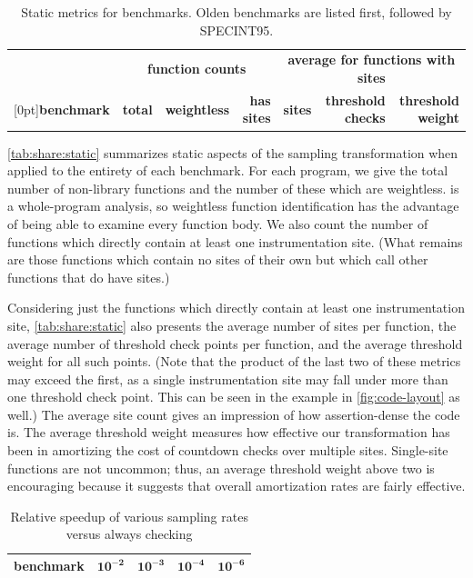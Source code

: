 \begin{table}[tb]
  \centering
  \small
  \begin{tabular}{|l|rrr|rrr|}
    \hline
    & \multicolumn{3}{c|}{\textbf{function counts}} & \multicolumn{3}{c|}{\textbf{average for functions with sites}} \\
    \raisebox{1.5ex}[0pt]{\textbf{benchmark}} & \textbf{total} & \textbf{weightless} & \textbf{has sites} & \textbf{sites} & \textbf{threshold checks} & \textbf{threshold weight} \\
    \hline\hline
    
    \hline
    
    \hline
  \end{tabular}
  \caption{Static metrics for \CCured benchmarks.  Olden benchmarks
    are listed first, followed by SPECINT95.}
  \label{tab:share:static}
\end{table}

\autoref{tab:share:static} summarizes static aspects of the sampling
transformation when applied to the entirety of each benchmark.  For
each program, we give the total number of non-library functions and
the number of these which are weightless.  \CCured is a whole-program
analysis, so weightless function identification has the advantage of
being able to examine every function body.  We also count the number
of functions which directly contain at least one instrumentation site.
(What remains are those functions which contain no sites of their own
but which call other functions that do have sites.)

Considering just the functions which directly contain at least one
instrumentation site, \autoref{tab:share:static} also presents the
average number of sites per function, the average number of threshold
check points per function, and the average threshold weight for all
such points.  (Note that the product of the last two of these metrics
may exceed the first, as a single instrumentation site may fall under
more than one threshold check point.  This can be seen in the example
in \autoref{fig:code-layout} as well.)  The average site count gives
an impression of how assertion-dense the code is.  The average
threshold weight measures how effective our transformation has been in
amortizing the cost of countdown checks over multiple sites.
Single-site functions are not uncommon; thus, an average threshold
weight above two is encouraging because it suggests that overall
amortization rates are fairly effective.

\begin{table}
  \centering
  \begin{tabular}{|l|rrrr|}
    \hline
    \rule{0pt}{2.5ex}
    \textbf{benchmark} & $\mathbf{10^{-2}}$ & $\mathbf{10^{-3}}$ & $\mathbf{10^{-4}}$ & $\mathbf{10^{-6}}$ \\
    \hline\hline
    
    \hline
    
    \hline
  \end{tabular}
  \caption{Relative speedup of various sampling rates versus always checking}
  \label{tab:share:density}
\end{table}

